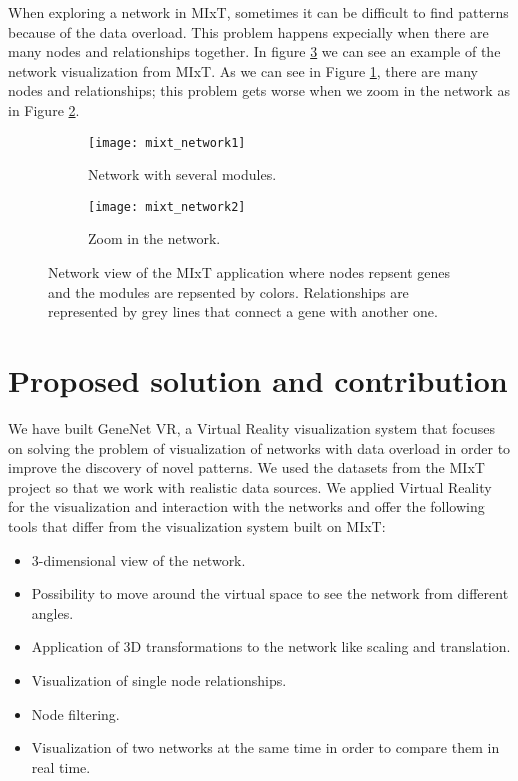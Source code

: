 When exploring a network in MIxT, sometimes it can be difficult to find patterns because of the data overload. This problem happens expecially when there are many nodes and relationships together. In figure \ref{fig:mixt_network} we can see an example of the network visualization from MIxT. As we can see in Figure \ref{fig:mixt_network1}, there are many nodes and relationships; this problem gets worse when we zoom in the network as in Figure \ref{fig:mixt_network_zoom}.

\begin{figure}[h!]
    \centering%
    \begin{subfigure}[t]{0.5\textwidth}
        \centering%
        \texttt{[image: mixt\_network1]}
        \caption{Network with several modules.}
        \label{fig:mixt_network1}
    \end{subfigure}%
    \begin{subfigure}[t]{0.5\textwidth}
        \centering%
        \texttt{[image: mixt\_network2]}
        \caption{Zoom in the network.}
        \label{fig:mixt_network_zoom}
    \end{subfigure}

    \caption{Network view of the MIxT application where nodes repsent genes and the modules are repsented by colors. Relationships are represented by grey lines that connect a gene with another one.}
    \label{fig:mixt_network}
\end{figure}

\section{Proposed solution and contribution}
We have built GeneNet VR, a Virtual Reality visualization system that focuses on solving the problem of visualization of networks with data overload in order to improve the discovery of novel patterns. We used the datasets from the MIxT project so that we work with realistic data sources. We applied Virtual Reality for the visualization and interaction with the networks and offer the following tools that differ from the visualization system built on MIxT:

\begin{itemize}
  \item 3-dimensional view of the network.
  \item Possibility to move around the virtual space to see the network from different angles.
  \item Application of 3D transformations to the network like scaling and translation.
  \item Visualization of single node relationships.
  \item Node filtering.
  \item Visualization of two networks at the same time in order to compare them in real time.
\end{itemize}

